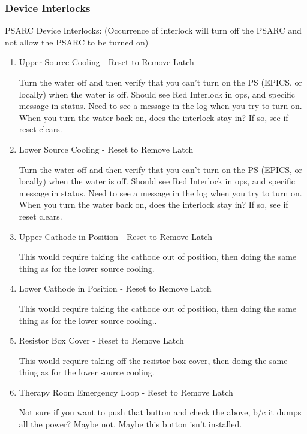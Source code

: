 \documentclass[11pt]{book}		%
\begin{document}
\subsubsection{Device Interlocks}

PSARC Device Interlocks:
(Occurrence of interlock will turn off the PSARC and not allow the PSARC to be turned on)

\begin{enumerate}
 \item Upper Source Cooling - Reset to Remove Latch

\color{red}
Turn the water off and then verify that you can't turn on the PS (EPICS, or locally) when the water is off. Should see Red Interlock in ops, and specific message in status. Need to see a message in the log when you try to turn on. When you turn the water back on, does the interlock stay in? If so, see if reset clears.
\color{black}

 \item Lower Source Cooling - Reset to Remove Latch

\color{red}
Turn the water off and then verify that you can't turn on the PS (EPICS, or locally) when the water is off. Should see Red Interlock in ops, and specific message in status. Need to see a message in the log when you try to turn on. When you turn the water back on, does the interlock stay in? If so, see if reset clears.
\color{black}

 \item Upper Cathode in Position - Reset to Remove Latch

\color{red}
This would require taking the cathode out of position, then doing the same thing as for the lower source cooling.
\color{black}

 \item Lower Cathode in Position - Reset to Remove Latch

\color{red}
This would require taking the cathode out of position, then doing the same thing as for the lower source cooling..
\color{black}

 \item Resistor Box Cover - Reset to Remove Latch

\color{red}
This would require taking off the resistor box cover, then doing the same thing as for the lower source cooling.
\color{black}

 \item Therapy Room Emergency Loop - Reset to Remove Latch

\color{red}
Not sure if you want to push that button and check the above, b/c it dumps all the power? Maybe not. Maybe this button isn't installed.
\color{black}

\end{enumerate}
\end{document}

